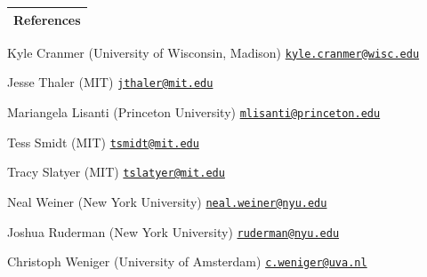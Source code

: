 \documentclass[letterpaper,11pt]{article}
\newenvironment{packed_itemize}{
\begin{itemize}[label=\raisebox{0.25ex}{\tiny$\bullet$}]
  \setlength{\itemsep}{4.2pt}
  \setlength{\parskip}{0pt}
  \setlength{\parsep}{0pt}}{\end{itemize}
}
\begin{document}

\noindent
\begin{tabular*}{\textwidth}{l@{\extracolsep{\fill}}}
\large {\sc \Large{References}}\\
\hline
\end{tabular*}\vspace{1.mm}

\begin{packed_itemize}
  \item Kyle Cranmer (University of Wisconsin, Madison) \hfill \href{mailto:kyle.cranmer@wisc.edu}{\texttt{kyle.cranmer@wisc.edu}}
  \item Jesse Thaler (MIT) \hfill \href{mailto:jthaler@mit.edu}{\texttt{jthaler@mit.edu}}
  \item Mariangela Lisanti (Princeton University) \hfill \href{mailto:mlisanti@princeton.edu}{\texttt{mlisanti@princeton.edu}}
  \item Tess Smidt (MIT) \hfill \href{mailto:tsmidt@mit.edu}{\texttt{tsmidt@mit.edu}}
  \item Tracy Slatyer (MIT) \hfill \href{mailto:tslatyer@mit.edu}{\texttt{tslatyer@mit.edu}}
  \item Neal Weiner (New York University) \hfill \href{mailto:neal.weiner@nyu.edu}{\texttt{neal.weiner@nyu.edu}}
  \item Joshua Ruderman (New York University) \hfill \href{mailto:ruderman@nyu.edu}{\texttt{ruderman@nyu.edu}}
  \item Christoph Weniger (University of Amsterdam) \hfill \href{mailto:c.weniger@uva.nl}{\texttt{c.weniger@uva.nl}}
\end{packed_itemize}


\vspace*{\fill}
\end{document}
